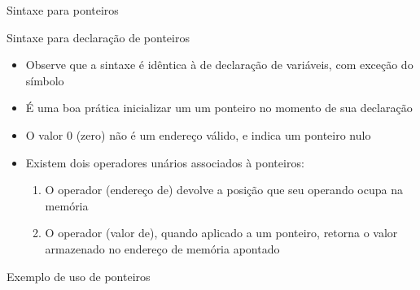 \begin{frame}[fragile]{Sintaxe para ponteiros}

    \begin{block}{Sintaxe para declaração de ponteiros}
    \end{block}

	\begin{itemize}
		\item Observe que a sintaxe é idêntica à de declaração de variáveis, com exceção
        do símbolo  

		\item É uma boa prática inicializar um um ponteiro no momento de sua declaração

        \item O valor 0 (zero) não é um endereço válido, e indica um ponteiro nulo

		\item Existem dois operadores unários associados à ponteiros:

        \begin{enumerate}
		\item O operador  (endereço de) devolve a posição que seu operando 
        ocupa na memória

		\item O operador  (valor de), quando aplicado a um ponteiro, retorna o 
        valor armazenado no endereço de memória apontado
        \end{enumerate}
	\end{itemize}

\end{frame} 

\begin{frame}[fragile]{Exemplo de uso de ponteiros}
\end{frame}


